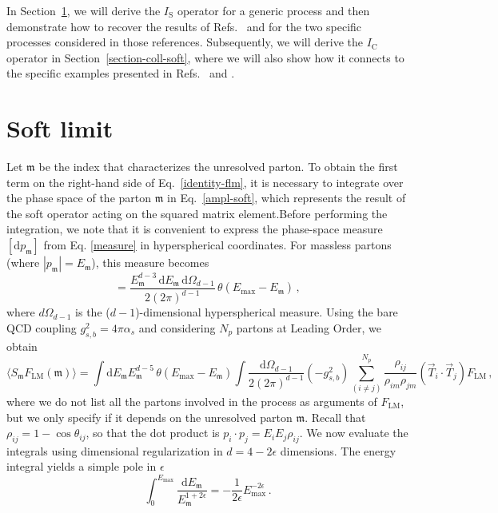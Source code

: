 \documentclass[a4paper, 12pt]{book}
\newcommand{\um}{\mathfrak{m}}
\begin{document}
In Section~\ref{section-soft-limit}, we will derive the $I_\mathrm{S}$ operator for a generic process and then demonstrate how to recover the results of Refs.~\cite{Caola:1907} and \cite{Asteriadis:1910} for the two specific processes considered in those references. Subsequently, we will derive the $I_\mathrm{C}$ operator in Section~\ref{section-coll-soft}, where we will also show how it connects to the specific examples presented in Refs.~\cite{Caola:1902} and \cite{Caola:1907}.
  
\section{Soft limit}
\label{section-soft-limit}
Let $\um$ be the index that characterizes the unresolved parton. To obtain the first term on the right-hand side of Eq.~\ref{identity-flm}, it is necessary to integrate over the phase space of the parton $\um$ in Eq.~\ref{ampl-soft}, which represents the result of the soft operator acting on the squared matrix element.Before performing the integration, we note that it is convenient to express the phase-space measure $[\mathrm{d}p_\um]$ from Eq. \ref{measure} in hyperspherical coordinates. For massless partons (where $|p_\um|=E_\um$), this measure becomes
\begin{equation}
  [\mathrm{d}p_\um] = \frac{E_\um^{d-3} \,\mathrm{d}E_\um  \, \mathrm{d}\Omega_{d-1}}{2 (2 \pi)^{d-1}} \, \theta(E_{\mathrm{max}}-E_\um) \, ,
  \label{measure-ps}
\end{equation}
where ${d}\Omega_{d-1}$ is the ($d-1$)-dimensional hyperspherical measure. Using the bare QCD coupling $g_{s,b}^2 = 4\pi\alpha_s$ and considering $N_p$ partons at Leading Order, we obtain
\begin{equation}
  \langle S_\um F_{\mathrm{LM}} (\um) \rangle = \int \mathrm{d}E_\um E_\um^{d-5} \, \theta(E_{\mathrm{max}}-E_\um)  \int \frac{\mathrm{d}\Omega_{d-1}}{2 (2 \pi)^{d-1}} (-g_{s,b}^2) \sum_{(i \neq j)}^{N_p} \frac{\rho_{ij}}{\rho_{im}\rho_{jm}} (\vec{T}_i \cdot \vec{T}_j) F_{\mathrm{LM}} \, ,
\end{equation}
where we do not list all the partons involved in the process as arguments of $F_{\mathrm{LM}}$, but we only 
specify if it depends on the unresolved parton $\um$. Recall that $\rho_{ij} = 1 - \cos\theta_{ij}$, so that the dot product is $p_i \cdot p_j = E_i E_j \rho_{ij}$. We now evaluate the integrals using dimensional regularization in $d=4-2\epsilon$ dimensions. The energy integral yields a simple pole in $\epsilon$
\begin{equation}
  \int_0^{E_{\mathrm{max}}} \frac{\mathrm{d}E_\um}{ E_\um^{1+2\epsilon}} = - \frac{1}{2 \epsilon} E_{\mathrm{max}}^{-2 \epsilon} \, .
\end{equation}
\end{document}
